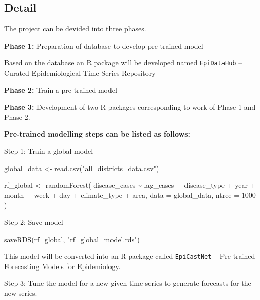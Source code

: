 \documentclass[
]{article}
\newenvironment{Shaded}{\begin{snugshade}}{\end{snugshade}}
\newcommand{\AttributeTok}[1]{\textcolor[rgb]{0.40,0.45,0.13}{#1}}
\newcommand{\DecValTok}[1]{\textcolor[rgb]{0.68,0.00,0.00}{#1}}
\newcommand{\FunctionTok}[1]{\textcolor[rgb]{0.28,0.35,0.67}{#1}}
\newcommand{\NormalTok}[1]{\textcolor[rgb]{0.00,0.23,0.31}{#1}}
\newcommand{\OtherTok}[1]{\textcolor[rgb]{0.00,0.23,0.31}{#1}}
\newcommand{\SpecialCharTok}[1]{\textcolor[rgb]{0.37,0.37,0.37}{#1}}
\newcommand{\StringTok}[1]{\textcolor[rgb]{0.13,0.47,0.30}{#1}}
\begin{document}
\subsection{Detail}\label{detail}

The project can be devided into three phases.

\textbf{Phase 1:} Preparation of database to develop pre-trained model

Based on the database an R package will be developed named
\texttt{EpiDataHub} -- Curated Epidemiological Time Series Repository

\textbf{Phase 2:} Train a pre-trained model

\textbf{Phase 3:} Development of two R packages corresponding to work of
Phase 1 and Phase 2.

\textbf{Pre-trained modelling steps can be listed as follows:}

Step 1: Train a global model

\begin{Shaded}
\begin{Highlighting}[]
\NormalTok{global\_data }\OtherTok{\textless{}{-}} \FunctionTok{read.csv}\NormalTok{(}\StringTok{"all\_districts\_data.csv"}\NormalTok{)}

\NormalTok{rf\_global }\OtherTok{\textless{}{-}} \FunctionTok{randomForest}\NormalTok{(}
\NormalTok{  disease\_cases }\SpecialCharTok{\textasciitilde{}}\NormalTok{ lag\_cases }\SpecialCharTok{+}\NormalTok{ disease\_type }\SpecialCharTok{+}\NormalTok{ year }\SpecialCharTok{+}\NormalTok{ month }\SpecialCharTok{+}\NormalTok{ week }\SpecialCharTok{+}\NormalTok{ day }\SpecialCharTok{+} 
\NormalTok{  climate\_type }\SpecialCharTok{+}\NormalTok{ area,}
  \AttributeTok{data =}\NormalTok{ global\_data,}
  \AttributeTok{ntree =} \DecValTok{1000}
\NormalTok{)}
\end{Highlighting}
\end{Shaded}

Step 2: Save model

\begin{Shaded}
\begin{Highlighting}[]
\FunctionTok{saveRDS}\NormalTok{(rf\_global, }\StringTok{"rf\_global\_model.rds"}\NormalTok{) }
\end{Highlighting}
\end{Shaded}

This model will be converted into an R package called
\texttt{EpiCastNet} -- Pre-trained Forecasting Models for Epidemiology.

Step 3: Tune the model for a new given time series to generate forecasts
for the new series.
\end{document}
